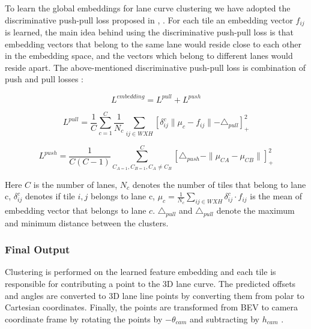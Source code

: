          To learn the global embeddings for lane curve clustering we have adopted the discriminative push-pull loss proposed in \cite{DBLP:journals/corr/abs-1802-05591} , \cite{DBLP:journals/corr/abs-1708-02551}. For each tile an embedding vector $f_{ij}$ is learned, the main idea behind using the discriminative push-pull loss is that embedding vectors that \cite{DBLP:journals/corr/abs-2011-01535} belong to the same lane would reside close to each other in the embedding space, and the vectors which belong to different lanes would reside apart. The above-mentioned discriminative push-pull loss is combination of push and pull losses \cite{DBLP:journals/corr/abs-2011-01535}:
            
            \begin{equation}
                L^{embedding} = L^{pull} + L^{push}
            \end{equation}
             
             \begin{equation}
                     L^{pull} = \frac{1}{C} \sum^{C}_{c=1}\frac{1}{N_{c}} \sum_{ij \in WXH}[ \delta_{ij}^{c} \parallel \mu_{c} - f_{ij}  \parallel - \triangle_{pull} ]_{+}^{2} 
             \end{equation}
             
             \begin{equation}
                 L^{push} =  \frac{1}{C(C -1)} \sum^{C}_{C_{A=1}, C_{B=1}, C_{A} \not =C_{B}}[ \triangle_{push} - \parallel \mu_{CA} - \mu_{CB}\parallel ]_{+}^{2}
             \end{equation}
            
            Here \cite{DBLP:journals/corr/abs-2011-01535} $C$ is the number of lanes, $N_{c}$ denotes the number of tiles that belong to lane c, $\delta_{ij}^{c}$ denotes if tile $i,j$ belongs to lane c, $\mu_{c} = \frac{1}{N_{c}} \sum_{ij \in WXH } \delta^{c}_{ij} \cdot f_{ij}$ is the mean of embedding vector that belongs to lane $c$. $\triangle_{pull}$ and $\triangle_{pull}$ denote the maximum and minimum distance between the clusters. 
            
        \subsubsection{Final Output}
        
        Clustering is performed on the learned feature embedding and each tile is responsible for contributing a point to the 3D lane curve. The predicted offsets and angles are converted to 3D lane line points by \cite{DBLP:journals/corr/abs-2011-01535} converting them from polar to Cartesian coordinates. Finally, the points are transformed from BEV to camera coordinate frame by rotating the points by  $-\theta_{cam}$ and subtracting by $h_{cam}$ \cite{DBLP:journals/corr/abs-2011-01535}. 
        
